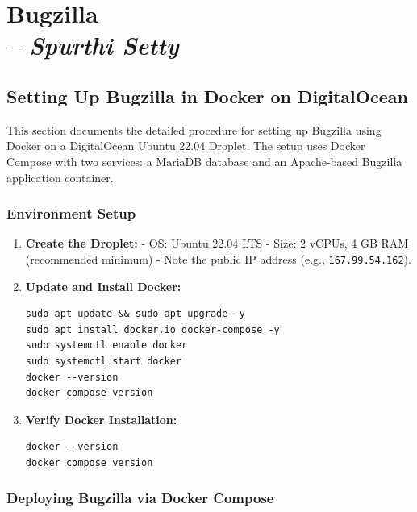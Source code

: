 \chapter{Bugzilla \\
\small{\textit{-- Spurthi Setty}}
\label{Chapter::Bugzilla}}

\section{Setting Up Bugzilla in Docker on DigitalOcean}

This section documents the detailed procedure for setting up Bugzilla using Docker on a DigitalOcean Ubuntu 22.04 Droplet.  
The setup uses Docker Compose with two services: a MariaDB database and an Apache-based Bugzilla application container.

\subsection{Environment Setup}

\begin{enumerate}
    \item \textbf{Create the Droplet:}  
    - OS: Ubuntu 22.04 LTS  
    - Size: 2 vCPUs, 4 GB RAM (recommended minimum)  
    - Note the public IP address (e.g., \texttt{167.99.54.162}).

    \item \textbf{Update and Install Docker:}

    \begin{verbatim}
sudo apt update && sudo apt upgrade -y
sudo apt install docker.io docker-compose -y
sudo systemctl enable docker
sudo systemctl start docker
docker --version
docker compose version
    \end{verbatim}

    \item \textbf{Verify Docker Installation:}

    \begin{verbatim}
docker --version
docker compose version
    \end{verbatim}
\end{enumerate}

\subsection{Deploying Bugzilla via Docker Compose}


